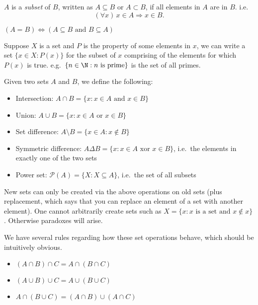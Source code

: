 \documentclass[a4paper]{article}
\begin{document}
\begin{defi}[Subsets]
  $A$ is a \emph{subset} of $B$, written as $A\subseteq B$ or $A\subset B$, if all elements in $A$ are in $B$. i.e.
  \[
    (\forall x)\,x\in A\Rightarrow x\in B.
  \]
\end{defi}

\begin{thm}
  $(A=B)\Leftrightarrow (A\subseteq B \text{ and }B\subseteq A)$
\end{thm}

Suppose $X$ is a set and $P$ is the property of some elements in $x$, we can write a set $\{x\in X:P(x)\}$ for the subset of $x$ comprising of the elements for which $P(x)$ is true. e.g.\ $\{n\in \N : n \text{ is prime}\}$ is the set of all primes.

\begin{defi}
  Given two sets $A$ and $B$, we define the following:
  \begin{itemize}
    \item Intersection: $A\cap B = \{x:x\in A \text{ and } x\in B\}$
    \item Union: $A\cup B = \{x:x\in A\text{ or }x\in B\}$
    \item Set difference: $A\setminus B = \{x\in A: x\not\in B\}$
    \item Symmetric difference: $A\Delta B = \{x: x\in A\text{ xor } x\in B\}$, i.e.\ the elements in exactly one of the two sets
    \item Power set: $\mathcal{P}(A) = \{ X : X\subseteq A\}$, i.e.\ the set of all subsets
  \end{itemize}
\end{defi}

New sets can only be created via the above operations on old sets (plus replacement, which says that you can replace an element of a set with another element). One cannot arbitrarily create sets such as $X=\{x:x\text{ is a set and }x\not\in x\}$. Otherwise paradoxes will arise.

We have several rules regarding how these set operations behave, which should be intuitively obvious.
\begin{prop}\leavevmode
  \begin{itemize}
    \item $(A\cap B)\cap C = A \cap (B\cap C)$
    \item $(A\cup B)\cup C = A\cup (B\cup C)$
    \item $A\cap(B\cup C) = (A\cap B)\cup (A\cap C)$
  \end{itemize}
\end{prop}
\end{document}
